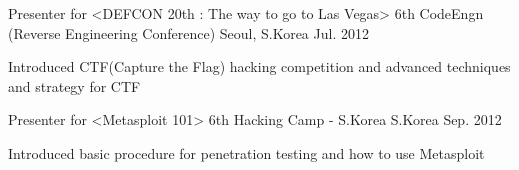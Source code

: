 {\begin{cventries}
  \cventry
    {Presenter for <DEFCON 20th : The way to go to Las Vegas>}
    {6th CodeEngn (Reverse Engineering Conference)}
    {Seoul, S.Korea}
    {Jul. 2012}
    {
      \begin{cvitems}
        \item {Introduced CTF(Capture the Flag) hacking competition and advanced techniques and strategy for CTF}
      \end{cvitems}
    }

  \cventry
    {Presenter for <Metasploit 101>}
    {6th Hacking Camp - S.Korea}
    {S.Korea}
    {Sep. 2012}
    {
      \begin{cvitems}
        \item {Introduced basic procedure for penetration testing and how to use Metasploit}
      \end{cvitems}
    }
\end{cventries}
}
